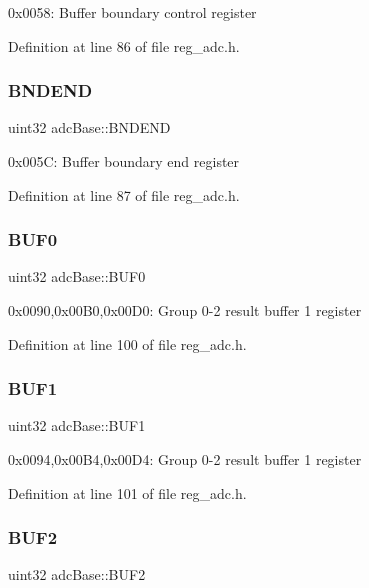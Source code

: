 0x0058\+: Buffer boundary control register 

Definition at line 86 of file reg\+\_\+adc.\+h.

\mbox{\label{structadcBase_adf1c5b2f008827e3a0af2f4e29ae083f}} 
\subsubsection{\texorpdfstring{B\+N\+D\+E\+ND}{BNDEND}}
{\footnotesize\ttfamily uint32 adc\+Base\+::\+B\+N\+D\+E\+ND}

0x005C\+: Buffer boundary end register 

Definition at line 87 of file reg\+\_\+adc.\+h.

\mbox{\label{structadcBase_ac4fcd2c72e602ab9c2a3e82071982a80}} 
\subsubsection{\texorpdfstring{B\+U\+F0}{BUF0}}
{\footnotesize\ttfamily uint32 adc\+Base\+::\+B\+U\+F0}

0x0090,0x00\+B0,0x00\+D0\+: Group 0-\/2 result buffer 1 register 

Definition at line 100 of file reg\+\_\+adc.\+h.

\mbox{\label{structadcBase_a29cda6c2d65c2a7881c7d563d0c0c02a}} 
\subsubsection{\texorpdfstring{B\+U\+F1}{BUF1}}
{\footnotesize\ttfamily uint32 adc\+Base\+::\+B\+U\+F1}

0x0094,0x00\+B4,0x00\+D4\+: Group 0-\/2 result buffer 1 register 

Definition at line 101 of file reg\+\_\+adc.\+h.

\mbox{\label{structadcBase_ab6fa27c398c322a850a11f7c5c83f5bb}} 
\subsubsection{\texorpdfstring{B\+U\+F2}{BUF2}}
{\footnotesize\ttfamily uint32 adc\+Base\+::\+B\+U\+F2}

